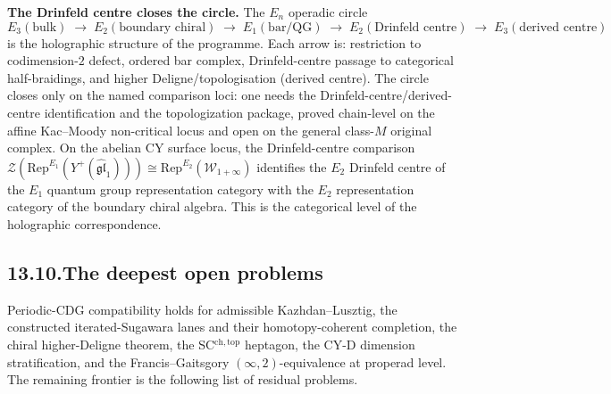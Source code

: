 \documentclass[11pt,reqno]{amsart}
\theoremstyle{definition}
\theoremstyle{remark}
\providecommand{\cW}{\mathcal{W}}
\providecommand{\cZ}{\mathcal{Z}}
\providecommand{\fgl}{\mathfrak{gl}}
\providecommand{\Rep}{\mathrm{Rep}}
\numberwithin{equation}{section}
\begin{document}
\medskip\noindent\textbf{The Drinfeld centre closes the
circle.}\enspace
The $E_n$ operadic circle
\[
E_3(\text{bulk})
\;\to\;
E_2(\text{boundary chiral})
\;\to\;
E_1(\text{bar/QG})
\;\to\;
E_2(\text{Drinfeld centre})
\;\to\;
E_3(\text{derived centre})
\]
is the holographic structure of the programme. Each arrow is:
restriction to codimension-$2$ defect, ordered bar complex,
Drinfeld-centre passage to categorical half-braidings, and higher
Deligne/topologisation (derived centre). The circle closes only on the
named comparison loci: one needs the Drinfeld-centre/derived-centre
identification and the topologization package, proved chain-level on
the affine Kac--Moody non-critical locus and open on the general
class-$M$ original complex. On the abelian CY surface locus, the
Drinfeld-centre comparison
$\cZ(\Rep^{E_1}(Y^+(\widehat{\fgl}_1)))
\cong \Rep^{E_2}(\cW_{1+\infty})$
identifies the $E_2$ Drinfeld centre of the $E_1$ quantum group
representation category with the $E_2$ representation category of
the boundary chiral algebra. This is the categorical level of
the holographic correspondence.

\subsection*{13.10.\enspace The deepest open problems}

Periodic-CDG compatibility holds for admissible Kazhdan--Lusztig,
the constructed iterated-Sugawara lanes and their homotopy-coherent
completion, the
chiral higher-Deligne theorem, the SC$^{\mathrm{ch,top}}$ heptagon,
the CY-D dimension stratification, and the Francis--Gaitsgory
$(\infty,2)$-equivalence at properad level. The remaining frontier is
the following list of residual problems.
\end{document}
